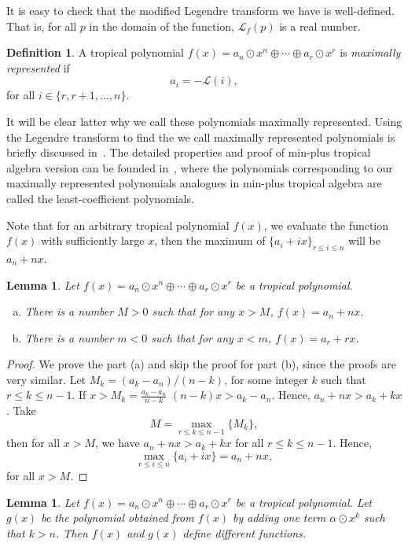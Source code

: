 \documentclass{amsart}
\newtheorem{lem}[thm]{Lemma}
\theoremstyle{definition}
\newtheorem{defn}{Definition}[section]
\theoremstyle{remark}
\begin{document}
It is easy to check that the modified Legendre transform we have is well-defined. That is, for all $p$ in the domain of the function, ${\mathcal{L}}_f(p)$ is a real number.

\begin{defn}\label{def:maxpoly}
A tropical polynomial $f(x) = a_n {\odot} x^n {\oplus} \cdots {\oplus} a_r {\odot} x^r$ is \emph{maximally represented} if
\[
a_i = -{\mathcal{L}} (i),
\]
for all $i \in \{r, r+1, \ldots, n\}$.
\end{defn}

It will be clear latter why we call these polynomials maximally represented. Using the Legendre transform to find the we call maximally represented polynomials is briefly discussed in~\cite{ims09, mikhalkin06}. The detailed properties and proof of min-plus tropical algebra version can be founded in~\cite{gm07}, where the polynomials corresponding to our maximally represented polynomials analogues in min-plus tropical algebra are called the least-coefficient polynomials.

Note that for an arbitrary tropical polynomial $f(x)$, we evaluate the function $f(x)$ with sufficiently large $x$, then the maximum of $\{ a_i + i x \}_{r \leq i \leq n} $ will be $a_n + nx$.
\begin{lem}\label{lem:m}
Let $f(x) = a_n {\odot} x^n {\oplus} \cdots {\oplus} a_r {\odot} x^r$ be a tropical polynomial.
\begin{enumerate}[(a)]
\item There is a number $M > 0$ such that for any $x > M$, $f(x) = a_n + nx$. 
\item There is a number $m<0$ such that for any $x<m$, $f(x) = a_r + rx$.
\end{enumerate}
\end{lem}
\begin{proof}
We prove the part (a) and skip the proof for part (b), since the proofs are very similar.
Let $M_k = (a_k - a_n)/(n-k)$, for some integer $k$ such that $r \leq k \leq n-1$.  If $x > M_k = \frac{a_k - a_n}{n-k}$ $(n-k)x > a_k - a_n$. Hence, $a_n + nx > a_k +kx$. Take
\[
M = \max_{r \leq k \leq n-1} \{ M_k\},
\]
then for all $x > M$, we have $a_n + nx > a_k +kx$ for all $r \leq k \leq n-1$. Hence,
\[
\max_{r \leq i \leq n} \{ a_i + ix \} = a_n + nx,
\]
for all $x > M$.
\end{proof}
\begin{lem}
Let $f(x) = a_n {\odot} x^n {\oplus} \cdots {\oplus} a_r {\odot} x^r$ be a tropical polynomial. Let $g(x)$ be the polynomial obtained from $f(x)$ by adding one term $\alpha {\odot} x^k$ such that $k>n$. Then $f(x)$ and $g(x)$ define different functions.
\end{lem}
\end{document}
